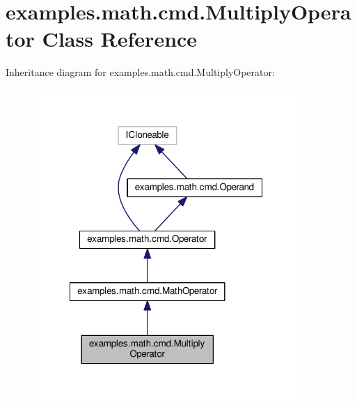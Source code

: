 \hypertarget{classexamples_1_1math_1_1cmd_1_1_multiply_operator}{\section{examples.\-math.\-cmd.\-Multiply\-Operator Class Reference}
\label{classexamples_1_1math_1_1cmd_1_1_multiply_operator}
}


Inheritance diagram for examples.\-math.\-cmd.\-Multiply\-Operator\-:
\nopagebreak
\begin{figure}[H]
\begin{center}
\leavevmode
\includegraphics[width=286pt]{classexamples_1_1math_1_1cmd_1_1_multiply_operator__inherit__graph}
\end{center}
\end{figure}


